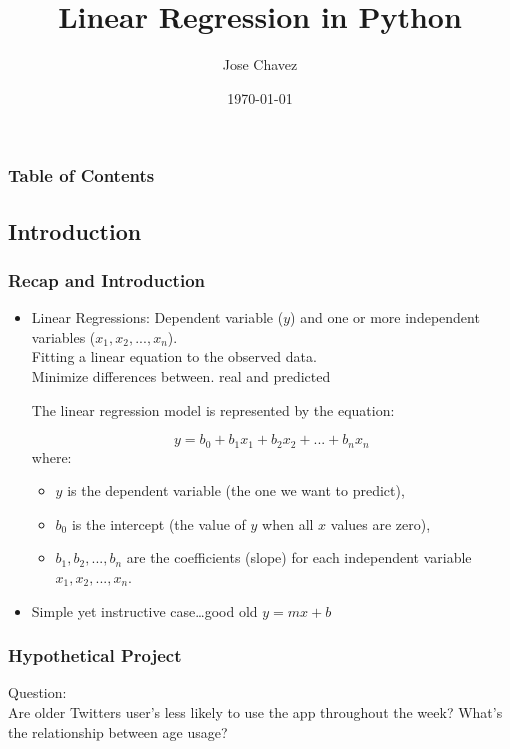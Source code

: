\documentclass{beamer}
\title{Linear Regression in Python}
\author{Jose Chavez}
\date{\today}
\newcounter{slidenum}
\begin{document}
\frame{\titlepage}

\begin{frame}
\frametitle{Table of Contents}
\tableofcontents
\end{frame}


\begin{frame}
\section{Introduction}
\frametitle{Recap and Introduction}
\begin{itemize}
\item Linear Regressions: 
	Dependent variable ($y$) and one or more independent variables ($x_1, x_2, ..., x_n$).\\
	Fitting a linear equation to the observed data. \\
	Minimize differences between. real and predicted

The linear regression model is represented by the equation:

\[ y = b_0 + b_1x_1 + b_2x_2 + ... + b_nx_n \]
where:
\begin{itemize}
    \item $y$ is the dependent variable (the one we want to predict),
    \item $b_0$ is the intercept (the value of $y$ when all $x$ values are zero),
    \item $b_1, b_2, ..., b_n$ are the coefficients (slope) for each independent variable $x_1, x_2, ..., x_n$.
\end{itemize}
\item Simple yet instructive case\ldots good old
	$ y = mx + b$

\end{itemize}
\end{frame}

\begin{frame}
	\frametitle{Hypothetical Project}

	Question:\\
	Are older Twitters user's less likely to use the app throughout the week? What's the
	relationship between age usage? 

\end{frame}
\end{document}
